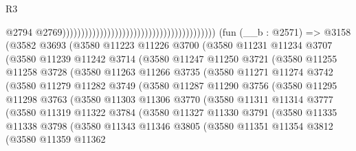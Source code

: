 \begin{lexlean}{R3}
\begin{coremodule}
                                                                                      @2794
                                                                                      @2769)))))))))))))))))))))))))))))))))))))))))
    (fun (__b : @2571) =>
    @3158
      (@3582
        @3693
        (@3580
          @11223
          @11226
          @3700
          (@3580
            @11231
            @11234
            @3707
            (@3580
              @11239
              @11242
              @3714
              (@3580
                @11247
                @11250
                @3721
                (@3580
                  @11255
                  @11258
                  @3728
                  (@3580
                    @11263
                    @11266
                    @3735
                    (@3580
                      @11271
                      @11274
                      @3742
                      (@3580
                        @11279
                        @11282
                        @3749
                        (@3580
                          @11287
                          @11290
                          @3756
                          (@3580
                            @11295
                            @11298
                            @3763
                            (@3580
                              @11303
                              @11306
                              @3770
                              (@3580
                                @11311
                                @11314
                                @3777
                                (@3580
                                  @11319
                                  @11322
                                  @3784
                                  (@3580
                                    @11327
                                    @11330
                                    @3791
                                    (@3580
                                      @11335
                                      @11338
                                      @3798
                                      (@3580
                                        @11343
                                        @11346
                                        @3805
                                        (@3580
                                          @11351
                                          @11354
                                          @3812
                                          (@3580
                                            @11359
                                            @11362

\end{coremodule}
\end{lexlean}
